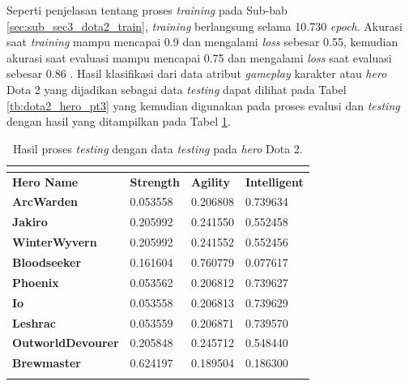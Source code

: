Seperti penjelasan tentang proses \textit{training} pada Sub-bab \ref{sec:sub_sec3_dota2_train}, \textit{training} berlangsung selama 10.730 \textit{epoch}. Akurasi saat \textit{training} mampu mencapai 0.9 dan mengalami \textit{loss} sebesar 0.55, kemudian akurasi saat evaluasi mampu mencapai 0.75 dan mengalami \textit{loss} saat evaluasi sebesar 0.86 . Hasil klasifikasi dari data atribut \textit{gameplay} karakter atau \textit{hero} Dota 2 yang dijadikan sebagai data \textit{testing} dapat dilihat pada Tabel \ref{tb:dota2_hero_pt3} yang kemudian digunakan pada proses evalusi dan \textit{testing} dengan hasil yang ditampilkan pada Tabel \ref{tb:dota2_valid_result}.
\vspace{-2ex}

\begin{longtable}{|l|l|l|l|}
	\caption{Hasil proses \textit{testing} dengan data \textit{testing} pada \textit{hero} Dota 2.}
	\vspace{1ex}
	\label{tb:dota2_valid_result}\\
	\hline
	\rowcolor[HTML]{C0C0C0} 
	\textbf{Hero Name} & \textbf{Strength} & \textbf{Agility} & \textbf{Intelligent} \\ \hline
	\rowcolor[HTML]{FFFFFF} 
	\textbf{ArcWarden} & 0.053558 & 0.206808 & {\color[HTML]{FE0000} 0.739634} \\ \hline
	\rowcolor[HTML]{FFFFFF} 
	\textbf{Jakiro} & 0.205992 & 0.241550 & {\color[HTML]{036400} 0.552458} \\ \hline
	\rowcolor[HTML]{FFFFFF} 
	\textbf{WinterWyvern} & 0.205992 & 0.241552 & {\color[HTML]{036400} 0.552456} \\ \hline
	\rowcolor[HTML]{FFFFFF} 
	\textbf{Bloodseeker} & 0.161604 & {\color[HTML]{036400} 0.760779} & 0.077617 \\ \hline
	\rowcolor[HTML]{FFFFFF}
	\textbf{Phoenix} & 0.053562 & 0.206812 & {\color[HTML]{FE0000} 0.739627} \\ \hline
	\rowcolor[HTML]{FFFFFF} 
	\textbf{Io} & 0.053558 & 0.206813 & {\color[HTML]{FE0000} 0.739629} \\ \hline
	\rowcolor[HTML]{FFFFFF} 
	\textbf{Leshrac} & 0.053559 & 0.206871 & {\color[HTML]{036400} 0.739570} \\ \hline
	\rowcolor[HTML]{FFFFFF} 
	\textbf{OutworldDevourer} & 0.205848 & 0.245712 & {\color[HTML]{036400} 0.548440} \\ \hline
	\rowcolor[HTML]{FFFFFF} 
	\textbf{Brewmaster} & {\color[HTML]{036400} 0.624197} & 0.189504 & 0.186300 \\ \hline
	\rowcolor[HTML]{FFFFFF} 

\end{longtable}
